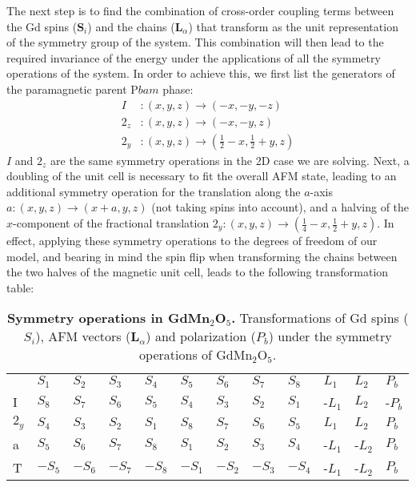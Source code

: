 The next step is to find the combination of cross-order coupling terms between the Gd spins ($\bm S_i$) and the chains ($\bm L_\alpha$) that transform as the unit representation of the symmetry group of the system.
This combination will then lead to the required invariance of the energy under the applications of all the symmetry operations of the system.
In order to achieve this, we first list the generators of the paramagnetic parent P$bam$ phase:
\begin{align}
	I &: (x, y, z) \rightarrow (-x, -y, -z)\\
	2_z &: (x, y, z) \rightarrow (-x, -y, z)\\
	2_y &: (x, y, z) \rightarrow (\frac{1}{2} - x, \frac{1}{2} + y, z)
\end{align}
$I$ and $2_z$ are the same symmetry operations in the 2D case we are solving.
Next, a doubling of the unit cell is necessary to fit the overall AFM state, leading to an additional symmetry operation for the translation along the $a$-axis $a: (x, y, z) \rightarrow (x + a, y, z)$ (not taking spins into account), and a halving of the $x$-component of the fractional translation $2_y: (x, y, z) \rightarrow (\frac{1}{4} - x, \frac{1}{2}+y, z)$.
In effect, applying these symmetry operations to the degrees of freedom of our model, and bearing in mind the spin flip when transforming the chains between the two halves of the magnetic unit cell, leads to the following transformation table:
\begin{table}[h]
\centering
\begin{tabular}{|l|lllllllllll|}
\cline{1-12}
 & $S_1$ & $S_2$ & $S_3$ & $S_4$ & $S_5$ & $S_6$ & $S_7$ & $S_8$ & $L_1$ & $L_2$ & $P_b$ \\ \cline{1-12}
I & $S_8$ & $S_7$ & $S_6$ & $S_5$ & $S_4$ & $S_3$ & $S_2$ & $S_1$ & -$L_1$ & $L_2$ & -$P_b$ \\ \cline{1-12}
$2_y$ & $S_4$ & $S_3$ & $S_2$ & $S_1$ & $S_8$ & $S_7$ & $S_6$ & $S_5$ & $L_1$ & $L_2$ & $P_b$ \\ \cline{1-12}
a & $S_5$ & $S_6$ & $S_7$ & $S_8$ & $S_1$ & $S_2$ & $S_3$ & $S_4$ & -$L_1$ & -$L_2$ & $P_b$ \\ \cline{1-12}
T & $-S_5$ & $-S_6$ & $-S_7$ & $-S_8$ & $-S_1$ & $-S_2$ & $-S_3$ & $-S_4$ & -$L_1$ & -$L_2$ & $P_b$ \\ \cline{1-12}
\end{tabular}
\caption{\label{tab:GdMn2O5_symm}{\bf Symmetry operations in GdMn$_2$O$_5$.} Transformations of Gd spins ($S_i$), AFM vectors ($\bm L_\alpha$) and polarization ($P_b$) under the symmetry operations of GdMn$_2$O$_5$.}
\end{table}
